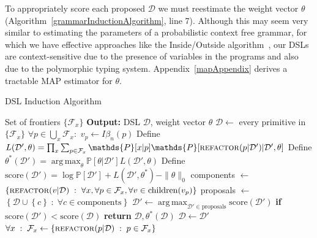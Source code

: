 \documentclass{article}
\DeclareMathOperator*{\argmax}{arg\,max} %
\newcommand{\probability}{\mathds{P}} %
\begin{document}
To appropriately score each proposed $\mathcal{D}$ we must reestimate
 the weight vector $\theta$ (Algorithm~\ref{grammarInductionAlgorithm}, line 7).
Although this  may seem 
very similar to estimating the parameters of a probabilistic context free grammar,
for which we have effective approaches like the Inside/Outside algorithm~\cite{international2000derivation},
our DSLs are context-sensitive due to the presence of variables
in the programs and also due to the polymorphic typing system.
Appendix~\ref{mapAppendix} derives a tractable MAP estimator for $\theta$.



\begin{algorithm}%
  \caption{DSL Induction Algorithm}
  \label{grammarInductionAlgorithm}
  \begin{algorithmic}[1]
     Set of frontiers $\{\mathcal{F}_x\}$
    \State \textbf{Output:} DSL $\mathcal{D}$, weight vector $\theta$
    \State $\mathcal{D}\gets$ every primitive in $\{\mathcal{F}_x\}$
    \State $\forall p\in \bigcup_{x}\mathcal{F}_x: $ $v_p\gets I\beta_n(p)$ 
    \State Define $L(\mathcal{D}',\theta) =  \prod_x \sum_{p\in \mathcal{F}_x} \probability[x|p]\probability[\text{\textsc{refactor}}(p|\mathcal{D}')|\mathcal{D}',\theta]$ 
    \State Define $\theta^*(\mathcal{D}') = \argmax_\theta \probability[\theta|\mathcal{D}'] L(\mathcal{D}',\theta)$ 
    \State Define $\text{score}(\mathcal{D}') = \log \probability[\mathcal{D}'] + L(\mathcal{D}',\theta^*) - \|\theta\|_0$ 
    \State components $\gets$ $\left\{\textsc{refactor}(v|\mathcal{D})\;:\;\forall x, \forall p\in \mathcal{F}_x, \forall v\in \text{children}(v_p) \right\}$ 
    \State proposals $\gets$ $\left\{\mathcal{D}\cup\left\{c \right\}\;:\;\forall c\in \text{components} \right\}$ 
    \State $\mathcal{D}'\gets \argmax_{\mathcal{D}'\in \text{proposals}}\text{score}(\mathcal{D}') $
    \State \textbf{if }$\text{score}(\mathcal{D}') < \text{score}(\mathcal{D})$\textbf{ return }$\mathcal{D},\theta^*(\mathcal{D})$
    \State $\mathcal{D}\gets\mathcal{D}'$ 
    \State $\forall x\;:\;\mathcal{F}_x\gets\left\{\text{\textsc{refactor}}(p|\mathcal{D})\;:\; p\in \mathcal{F}_x\right\}$
    \EndWhile
  \end{algorithmic}
\end{algorithm}
\end{document}
